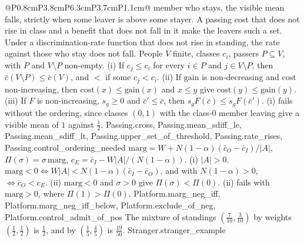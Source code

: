 \begin{longtable}{@{}P{0.8cm}P{3.8cm}P{6.3cm}P{3.7cm}P{1.1cm}@{}}
{  member who stays, the visible mean falls, strictly when some leaver is
  above some stayer. A passing cost that does not rise in class and a benefit
  that does not fall in it make the leavers such a set. Under a
  discrimination-rate function that does not rise in standing, the rate
  against those who stay does not fall.}
  {People $V$ finite, classes $c_i$, passers $P\subseteq V$, with $P$ and
  $V\setminus P$ non-empty.
  (i) If $c_j\le c_i$ for every $i\in P$ and $j\in V\setminus P$, then
  $\bar c(V\setminus P)\le\bar c(V)$, and $<$ if some $c_j<c_i$.
  (ii) If $\mathrm{gain}$ is non-decreasing and $\mathrm{cost}$ non-increasing, then
  $\mathrm{cost}(x)\le\mathrm{gain}(x)$ and $x\le y$ give $\mathrm{cost}(y)\le\mathrm{gain}(y)$.
  (iii) If $F$ is non-increasing, $s_g\ge0$ and $\bar c'\le\bar c$, then
  $s_gF(\bar c)\le s_gF(\bar c')$.
  (i) fails without the ordering, since classes $(0,1)$ with the class-$0$
  member leaving give a visible mean of $1$ against $\tfrac12$.}
  {Passing.cross, Passing.mean_sdiff_le, Passing.mean_sdiff_lt, Passing.upper_set_of_threshold, Passing.rate_rises, Passing.control_ordering_needed}
  {$\mathrm{marg}=W+N(1-\alpha)(\bar c_O-\bar c_I)/|A|$, $\Pi(\sigma)=\sigma\,\mathrm{marg}$,
  $c_E=\bar c_I-W|A|/(N(1-\alpha))$.
  (i) $|A|>0$. $\mathrm{marg}<0\iff W|A|<N(1-\alpha)(\bar c_I-\bar c_O)$, and
  with $N(1-\alpha)>0$, $\iff\bar c_O<c_E$.
  (ii) $\mathrm{marg}<0$ and $\sigma>0$ give $\Pi(\sigma)<\Pi(0)$.
  (ii) fails with $\mathrm{marg}>0$, where $\Pi(1)>\Pi(0)$.}
  {Platform.marg_neg_iff, Platform.marg_neg_iff_below, Platform.exclude_of_neg, Platform.control_admit_of_pos}
  {The mixture of standings $(\tfrac7{10},\tfrac3{10})$ by weights
  $(\tfrac12,\tfrac12)$ is $\tfrac12$, and by $(\tfrac15,\tfrac45)$ is
  $\tfrac{19}{50}$.}
  {Stranger.stranger_example}
\end{longtable}
